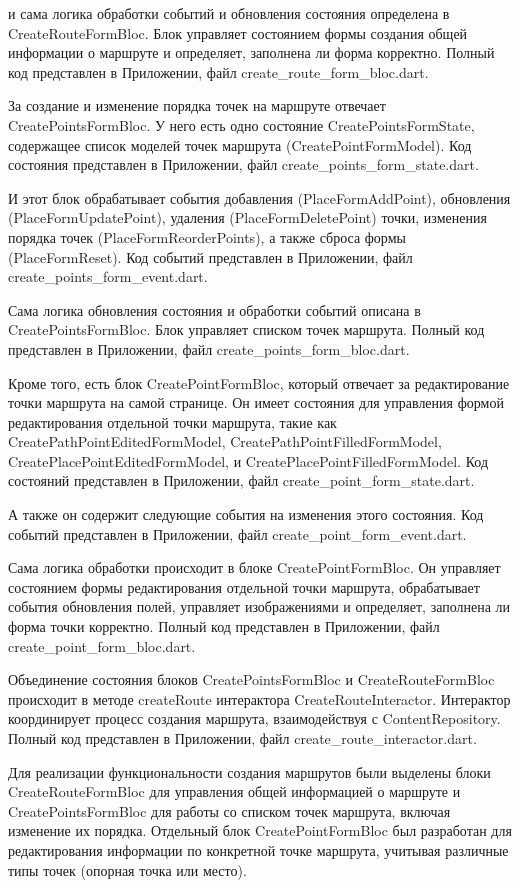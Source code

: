 и сама логика обработки событий и обновления состояния определена в CreateRouteFormBloc. Блок управляет состоянием формы создания общей информации о маршруте и определяет, заполнена ли форма корректно. Полный код представлен в Приложении, файл create\_route\_form\_bloc.dart.

За создание и изменение порядка точек на маршруте отвечает CreatePointsFormBloc. У него есть одно состояние CreatePointsFormState, содержащее список моделей точек маршрута (CreatePointFormModel). Код состояния представлен в Приложении, файл create\_points\_form\_state.dart.

И этот блок обрабатывает события добавления (PlaceFormAddPoint), обновления (PlaceFormUpdatePoint), удаления (PlaceFormDeletePoint) точки, изменения порядка точек (PlaceFormReorderPoints), а также сброса формы (PlaceFormReset). Код событий представлен в Приложении, файл create\_points\_form\_event.dart.

Сама логика обновления состояния и обработки событий описана в CreatePointsFormBloc. Блок управляет списком точек маршрута. Полный код представлен в Приложении, файл create\_points\_form\_bloc.dart.

Кроме того, есть блок CreatePointFormBloc, который отвечает за редактирование точки маршрута на самой странице. Он имеет состояния для управления формой редактирования отдельной точки маршрута, такие как CreatePathPointEditedFormModel, CreatePathPointFilledFormModel, CreatePlacePointEditedFormModel, и CreatePlacePointFilledFormModel. Код состояний представлен в Приложении, файл create\_point\_form\_state.dart.

А также он содержит следующие события на изменения этого состояния. Код событий представлен в Приложении, файл create\_point\_form\_event.dart.

Сама логика обработки происходит в блоке CreatePointFormBloc. Он управляет состоянием формы редактирования отдельной точки маршрута, обрабатывает события обновления полей, управляет изображениями и определяет, заполнена ли форма точки корректно. Полный код представлен в Приложении, файл create\_point\_form\_bloc.dart.

Объединение состояния блоков CreatePointsFormBloc и CreateRouteFormBloc  происходит в методе createRoute интерактора CreateRouteInteractor. Интерактор координирует процесс создания маршрута, взаимодействуя с ContentRepository. Полный код представлен в Приложении, файл create\_route\_interactor.dart.

Для реализации функциональности создания маршрутов были выделены блоки CreateRouteFormBloc  для управления общей информацией о маршруте и CreatePointsFormBloc  для работы со списком точек маршрута, включая изменение их порядка. Отдельный блок CreatePointFormBloc  был разработан для редактирования информации по конкретной точке маршрута, учитывая различные типы точек (опорная точка или место).  

